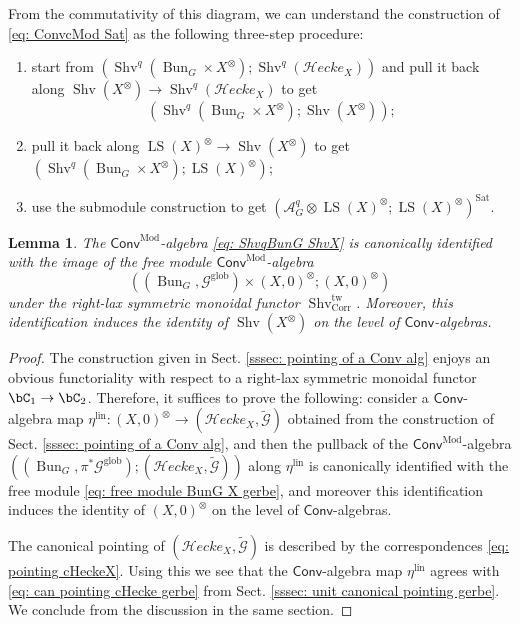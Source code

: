 \documentclass[10pt]{amsart}
\newtheorem{lemma}[subsubsection]{Lemma}
\theoremstyle{remark}
\newcommand{\wt}{\widetilde}
\newcommand{\on}{\operatorname}
\newcommand{\cA}{\mathcal{A}}
\newcommand{\cG}{\mathcal{G}}
\newcommand{\Shv}{\on{Shv}}
\newcommand{\LS}{\on{LS}}
\newcommand{\Bun}{\on{Bun}}
\newcommand{\Conv}{\mathsf{Conv}}
\newcommand{\ConvMod}{\mathsf{Conv}^{\on{Mod}}}
\newcommand{\cHecke}{\mathcal{H}ecke}
\newcommand{\Corr}{\on{Corr}}
\begin{document}
From the commutativity of this diagram, we can understand the construction of \eqref{eq: ConvcMod Sat} as the following three-step procedure:
\begin{enumerate}
    \item start from $(\Shv^q(\Bun_G\times X^{\otimes}); \Shv^q(\cHecke_{X}))$ and pull it back along $\Shv(X^{\otimes})\rightarrow \Shv^q(\cHecke_{X})$ to get
    \begin{equation}\label{eq: ShvqBunG ShvX}
        (\Shv^q(\Bun_G\times X^{\otimes}); \Shv(X^{\otimes}));
    \end{equation}
    \item pull it back along $\LS(X)^{\otimes}\rightarrow \Shv(X^{\otimes})$ to get $(\Shv^q(\Bun_G\times X^{\otimes}); \LS(X)^{\otimes})$;
    \item use the submodule construction to get $(\cA^q_G\otimes\LS(X)^{\otimes};\LS(X)^{\otimes})^{\on{Sat}}$.
\end{enumerate}

\begin{lemma}\label{lem: pullback equals free}
    The $\ConvMod$-algebra \eqref{eq: ShvqBunG ShvX} is canonically identified with the image of the free module $\ConvMod$-algebra
    \begin{equation}\label{eq: free module BunG X gerbe}
        ((\Bun_G,\cG^{\on{glob}})\times (X,0)^{\otimes}; (X,0)^{\otimes})
    \end{equation}
    under the right-lax symmetric monoidal functor $\Shv^{\on{tw}}_{\Corr}$. Moreover, this identification induces the identity of $\Shv(X^{\otimes})$ on the level of $\Conv$-algebras.
    \end{lemma}
    \begin{proof}
    The construction given in Sect. \ref{sssec: pointing of a Conv alg} enjoys an obvious functoriality with respect to a right-lax symmetric monoidal functor $\bC_1\rightarrow\bC_2$. Therefore, it suffices to prove the following: consider a $\Conv$-algebra map $\eta^{\on{lin}}:(X,0)^{\otimes}\rightarrow (\cHecke_X,\wt{\cG})$ obtained from the construction of Sect. \ref{sssec: pointing of a Conv alg}, and then the pullback of the $\ConvMod$-algebra $((\Bun_G,\pi^*\cG^{\on{glob}});(\cHecke_X,\wt{\cG}))$ along $\eta^{\on{lin}}$ is canonically identified with the free module \eqref{eq: free module BunG X gerbe}, and moreover this identification induces the identity of $(X,0)^{\otimes}$ on the level of $\Conv$-algebras. 
    \medskip

        The canonical pointing of $(\cHecke_X,\wt{\cG})$ is described by the correspondences \eqref{eq: pointing cHeckeX}. Using this we see that the $\Conv$-algebra map $\eta^{\on{lin}}$ agrees with \eqref{eq: can pointing cHecke gerbe} from Sect. \ref{sssec: unit canonical pointing gerbe}. We conclude from the discussion in the same section.
        \end{proof}
\end{document}
